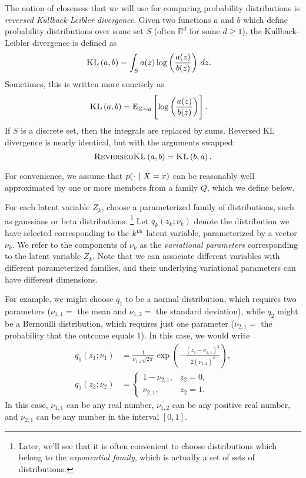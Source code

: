\documentclass[11pt]{article}
\newcommand{\KL}[2]{\textsc{KL}\left( {#1} , {#2} \right)}
\newcommand{\rKL}[2]{\textsc{ReversedKL}\left( {#1} , {#2} \right)}
\newcommand*{\placeholder}{\makebox[1ex]{$\cdot$}}
\begin{document}
The notion of closeness that we will use for comparing probability distributions is \emph{reversed Kullback-Leibler divergence}.
Given two functions $a$ and $b$ which define probability distributions over some set $S$ (often $\mathbb R^d$ for some $d \geq 1$), the Kullback-Leibler divergence is defined as
\begin{align}
\KL{a}{b}
&= \int_S a(z) \log \left( \frac{a(z)}{b(z)} \right) \, dz.
\end{align}
Sometimes, this is written more concisely as
\begin{align}
\KL{a}{b}
&= \expectOver{Z \sim a}{ \log \left( \frac{a(z)}{b(z)} \right) }.
\end{align}
If $S$ is a discrete set, then the integrals are replaced by sums.
Reversed KL divergence is nearly identical, but with the arguments swapped:
\[ \rKL{a}{b} = \KL{b}{a}. \]

For convenience, we assume that $p(\placeholder \mid X = x)$ can be reasonably well approximated by one or more members from a family $Q$, which we define below.

For each latent variable $Z_k$, choose a parameterized family of distributions, such as gaussians or beta distributions.%
\footnote{Later, we'll see that it is often convenient to choose distributions which belong to the \emph{exponential family}, which is actually a set of sets of distributions.}
Let $q_k(z_k; \nu_k)$ denote the distribution we have selected corresponding to the $k^{\mathrm{th}}$ latent variable, parameterized by a vector $\nu_k$.
We refer to the components of $\nu_k$ as the \emph{variational parameters} corresponding to the latent variable $Z_k$.
Note that we can associate different variables with different parameterized families, and their underlying variational parameters can have different dimensions.

For example, we might choose $q_1$ to be a normal distribution, which requires two parameters ($\nu_{1,1} =$ the mean and $\nu_{1,2} =$ the standard deviation), while $q_2$ might be a Bernoulli distribution, which requires just one parameter ($\nu_{2,1} =$ the probability that the outcome equals 1).
In this case, we would write
\begin{align}
q_1(z_1; \nu_1) &= \frac{1}{\nu_{1,2} \sqrt{2 \pi}} \exp\left( -\frac{(z_1 - \nu_{1,1})^2}{2 (\nu_{1,2})^2} \right), \\
q_2(z_2; \nu_2) &=
    \begin{cases}
    1-\nu_{2,1}, & z_2 = 0, \\
    \nu_{2,1},   & z_2 = 1.
    \end{cases}
\end{align}
In this case, $\nu_{1,1}$ can be any real number, $\nu_{1,2}$ can be any positive real number, and $\nu_{2,1}$ can be any number in the interval $[0,1]$.
\end{document}

